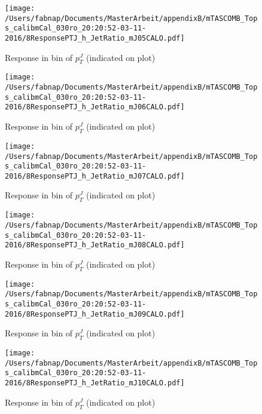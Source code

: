 \begin{figure}

\texttt{[image: /Users/fabnap/Documents/MasterArbeit/appendixB/mTASCOMB\_Tops\_calibmCal\_030ro\_20:20:52-03-11-2016/8ResponsePTJ\_h\_JetRatio\_mJ05CALO.pdf]}
\caption{Response in bin of  $p_{T}^{J}$ (indicated on plot)} 

\end{figure}

\begin{figure}

\texttt{[image: /Users/fabnap/Documents/MasterArbeit/appendixB/mTASCOMB\_Tops\_calibmCal\_030ro\_20:20:52-03-11-2016/8ResponsePTJ\_h\_JetRatio\_mJ06CALO.pdf]}
\caption{Response in bin of  $p_{T}^{J}$ (indicated on plot)} 

\end{figure}

%
\begin{figure}

\texttt{[image: /Users/fabnap/Documents/MasterArbeit/appendixB/mTASCOMB\_Tops\_calibmCal\_030ro\_20:20:52-03-11-2016/8ResponsePTJ\_h\_JetRatio\_mJ07CALO.pdf]}
\caption{Response in bin of  $p_{T}^{J}$ (indicated on plot)} 

\end{figure}


\begin{figure}

\texttt{[image: /Users/fabnap/Documents/MasterArbeit/appendixB/mTASCOMB\_Tops\_calibmCal\_030ro\_20:20:52-03-11-2016/8ResponsePTJ\_h\_JetRatio\_mJ08CALO.pdf]}
\caption{Response in bin of  $p_{T}^{J}$ (indicated on plot)} 

\end{figure}

\begin{figure}

\texttt{[image: /Users/fabnap/Documents/MasterArbeit/appendixB/mTASCOMB\_Tops\_calibmCal\_030ro\_20:20:52-03-11-2016/8ResponsePTJ\_h\_JetRatio\_mJ09CALO.pdf]}
\caption{Response in bin of  $p_{T}^{J}$ (indicated on plot)} 

\end{figure}

\begin{figure}

\texttt{[image: /Users/fabnap/Documents/MasterArbeit/appendixB/mTASCOMB\_Tops\_calibmCal\_030ro\_20:20:52-03-11-2016/8ResponsePTJ\_h\_JetRatio\_mJ10CALO.pdf]}
\caption{Response in bin of  $p_{T}^{J}$ (indicated on plot)} 

\end{figure}

